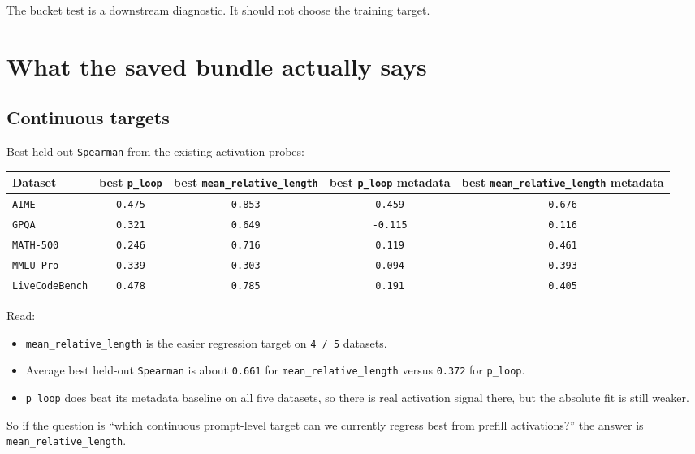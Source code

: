 \documentclass[11pt]{article}
\begin{document}
The bucket test is a downstream diagnostic. It should not choose the training
target.

\section*{What the saved bundle actually says}
\subsection*{Continuous targets}
Best held-out \texttt{Spearman} from the existing activation probes:

\begin{center}
\begin{tabular}{>{\raggedright\arraybackslash}p{1.55in}cccc}
\toprule
Dataset & best \texttt{p\_loop} & best \texttt{mean\_relative\_length} &
best \texttt{p\_loop} metadata & best \texttt{mean\_relative\_length}
metadata \\
\midrule
\texttt{AIME} & \texttt{0.475} & \texttt{0.853} & \texttt{0.459} &
\texttt{0.676} \\
\texttt{GPQA} & \texttt{0.321} & \texttt{0.649} & \texttt{-0.115} &
\texttt{0.116} \\
\texttt{MATH-500} & \texttt{0.246} & \texttt{0.716} & \texttt{0.119} &
\texttt{0.461} \\
\texttt{MMLU-Pro} & \texttt{0.339} & \texttt{0.303} & \texttt{0.094} &
\texttt{0.393} \\
\texttt{LiveCodeBench} & \texttt{0.478} & \texttt{0.785} &
\texttt{0.191} & \texttt{0.405} \\
\bottomrule
\end{tabular}
\end{center}

Read:
\begin{itemize}[leftmargin=1.5em]
\item \texttt{mean\_relative\_length} is the easier regression target on
\texttt{4 / 5} datasets.
\item Average best held-out \texttt{Spearman} is about \texttt{0.661} for
\texttt{mean\_relative\_length} versus \texttt{0.372} for \texttt{p\_loop}.
\item \texttt{p\_loop} does beat its metadata baseline on all five datasets, so
there is real activation signal there, but the absolute fit is still weaker.
\end{itemize}

So if the question is ``which continuous prompt-level target can we currently
regress best from prefill activations?'' the answer is
\texttt{mean\_relative\_length}.
\end{document}
